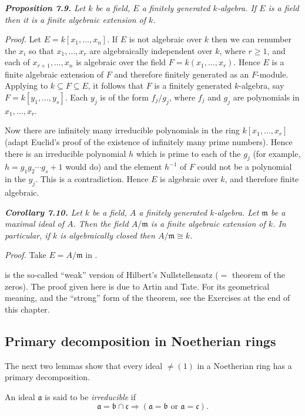 \medskip
\noindent\textit{\textbf{Proposition 7.9.} Let $k$ be a field, $E$ a finitely generated $k$-algebra.  If $E$ is a
field then it is a finite algebraic extension of $k$.}

\noindent\emph{Proof.}  Let $E=k[x_1,\ldots,x_n]$.  If $E$ is not algebraic over $k$ then we can renumber the $x_i$ so that $x_1,\ldots,x_r$ are algebraically independent over $k$, where
$r\geq1$, and each of $x_{r+1},\ldots,x_n$ is algebraic over the field $F=k(x_1,\ldots,x_r)$.
Hence $E$ is a finite algebraic extension of $F$ and therefore finitely generated as an
$F$-module.  Applying  to $k\subseteq F\subseteq E$, it follows that $F$ is a finitely generated
$k$-algebra, say $F=k[y_1,\ldots,y_s]$.  Each $y_j$ is of the form $f_j/g_j$, where $f_j$ and $g_j$
are polynomials in $x_1,\ldots,x_r$.

Now there are infinitely many irreducible polynomials in the ring
$k[x_1,\ldots,x_r]$ (adapt Euclid's proof of the existence of infinitely many prime
numbers).  Hence there is an irreducible polynomial $h$ which is prime to each
of the $g_j$ (for example, $h=g_1g_2\cdots g_s+1$ would do) and the element $h^{-1}$ of $F$
could not be a polynomial in the $y_j$.  This is a contradiction.  Hence $E$ is algebraic over $k$, and therefore finite algebraic.\proofbox

\medskip
\noindent\textit{\textbf{Corollary 7.10.} Let $k$ be a field, $A$ a finitely generated $k$-algebra.  Let $\mathfrak m$ be a
maximal ideal of $A$.  Then the field $A/\mathfrak m$ is a finite algebraic extension of $k$.
In particular, if $k$ is algebraically closed then $A/\mathfrak m\cong k$.}

\noindent\emph{Proof.}  Take $E=A/\mathfrak m$ in .\proofbox

 is the so-called ``weak'' version of Hilbert's Nullstellensatz
($={}$ theorem of the zeros).  The proof given here is due to Artin and Tate.  For
its geometrical meaning, and the ``strong'' form of the theorem, see the Exercises
at the end of this chapter.

\subsection{Primary decomposition in Noetherian rings}

The next two lemmas show that every ideal $\ne(1)$ in a Noetherian ring has a
primary decomposition.

An ideal $\mathfrak a$ is said to be \emph{irreducible} if
\[
\mathfrak a=\mathfrak b\cap\mathfrak c\Rightarrow(\mathfrak a=\mathfrak b\text{ or }\mathfrak a=\mathfrak c).
\]


